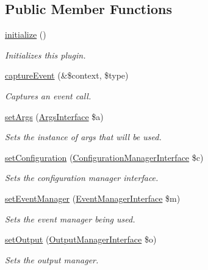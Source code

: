 \subsection*{Public Member Functions}
\begin{DoxyCompactItemize}
\item 
\hyperlink{classDrupalSiteStandardServerStructurePlugin_a6c4eb6416bd8a1c1cb88c35721c02743}{initialize} ()
\begin{DoxyCompactList}\small\item\em Initializes this plugin. \end{DoxyCompactList}\item 
\hyperlink{classDrupalSiteStandardServerStructurePlugin_ab0a5ff2fb1a89e16dfb2512fdb5745e8}{capture\-Event} (\&\$context, \$type)
\begin{DoxyCompactList}\small\item\em Captures an event call. \end{DoxyCompactList}\item 
\hyperlink{classGenericPlugin_abf0b12b47909ef3c4dada146ea775526}{set\-Args} (\hyperlink{interfaceArgsInterface}{Args\-Interface} \$a)
\begin{DoxyCompactList}\small\item\em Sets the instance of args that will be used. \end{DoxyCompactList}\item 
\hyperlink{classGenericPlugin_a009c5398920a9672a2f13af38756fd5f}{set\-Configuration} (\hyperlink{interfaceConfigurationManagerInterface}{Configuration\-Manager\-Interface} \$c)
\begin{DoxyCompactList}\small\item\em Sets the configuration manager interface. \end{DoxyCompactList}\item 
\hyperlink{classGenericPlugin_afc683b68f471d89aa6a95daebcbfe28a}{set\-Event\-Manager} (\hyperlink{interfaceEventManagerInterface}{Event\-Manager\-Interface} \$m)
\begin{DoxyCompactList}\small\item\em Sets the event manager being used. \end{DoxyCompactList}\item 
\hyperlink{classGenericPlugin_a00fb20d417f3ad2f9839591a84348218}{set\-Output} (\hyperlink{interfaceOutputManagerInterface}{Output\-Manager\-Interface} \$o)
\begin{DoxyCompactList}\small\item\em Sets the output manager. \end{DoxyCompactList}\item 

\end{DoxyCompactItemize}
